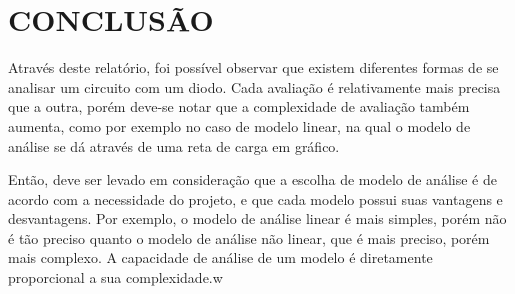 \chapter{CONCLUSÃO}

Através deste relatório, foi possível observar que existem diferentes formas de se analisar um circuito com um diodo. Cada avaliação é relativamente mais precisa que a outra, porém deve-se notar que a complexidade de avaliação também aumenta, como por exemplo no caso de modelo linear, na qual o modelo de análise se dá através de uma reta de carga em gráfico.

Então, deve ser levado em consideração que a escolha de modelo de análise é de acordo com a necessidade do projeto, e que cada modelo possui suas vantagens e desvantagens. Por exemplo, o modelo de análise linear é mais simples, porém não é tão preciso quanto o modelo de análise não linear, que é mais preciso, porém mais complexo. A capacidade de análise de um modelo é diretamente proporcional a sua complexidade.w